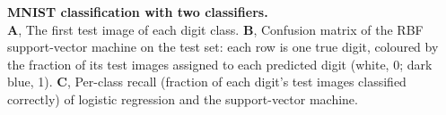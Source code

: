 \caption{\textbf{MNIST classification with two classifiers.}\\
\smallskip
\textbf{A}, The first test image of each digit class.
\textbf{B}, Confusion matrix of the RBF support-vector machine on the test set:
each row is one true digit, coloured by the fraction of its test images
assigned to each predicted digit (white, 0; dark blue, 1).
\textbf{C}, Per-class recall (fraction of each digit's test images classified
correctly) of logistic regression and the support-vector machine.
}
\label{fig:01_mnist_overview}
